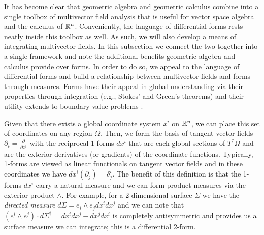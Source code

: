 It has become clear that geometric algebra and geometric calculus combine into a single toolbox of multivector field analysis that is useful for vector space algebra and the calculus of $\mathbb{R}^n$. Conveniently, the language of differential forms rests neatly inside this toolbox as well. As such, we will also develop a means of integrating multivector fields. In this subsection we connect the two together into a single framework and note the additional benefits geometric algebra and calculus provide over forms. In order to do so, we appeal to the language of differential forms and build a relationship between multivector fields and forms through measures. Forms have their appeal in global understanding via their properties through integration (e.g., Stokes' and Green's theorems) and their utility extends to boundary value problems \cite{schwarz_hodge_1995}.  

Given that there exists a global coordinate system $x^i$ on $\mathbb{R}^n$, we can place this set of coordinates on any region $\Omega$. Then, we form the basis of tangent vector fields $\partial_i = \frac{\partial}{\partial x^i}$ with the reciprocal 1-forms $dx^i$ that are each global sections of $T^*\Omega$ and are the exterior derivatives (or gradients) of the coordinate functions.  Typically, 1-forms are viewed as linear functionals on tangent vector fields and in these coordinates we have $dx^i  (\partial_j) = \delta^i_j$.  The benefit of this definition is that the 1-forms $dx^i$ carry a natural measure and we can form product measures via the exterior product $\wedge$.  For example, for a 2-dimensional surface $\Sigma$ we have the \emph{directed measure} $d\Sigma = e_i \wedge e_j dx^i dx^j$ and we can note that $(e^i \wedge e^j)\cdot d\Sigma^\dagger = dx^idx^j - dx^j dx^i$ is completely antisymmetric and provides us a surface measure we can integrate; this is a differential 2-form.

